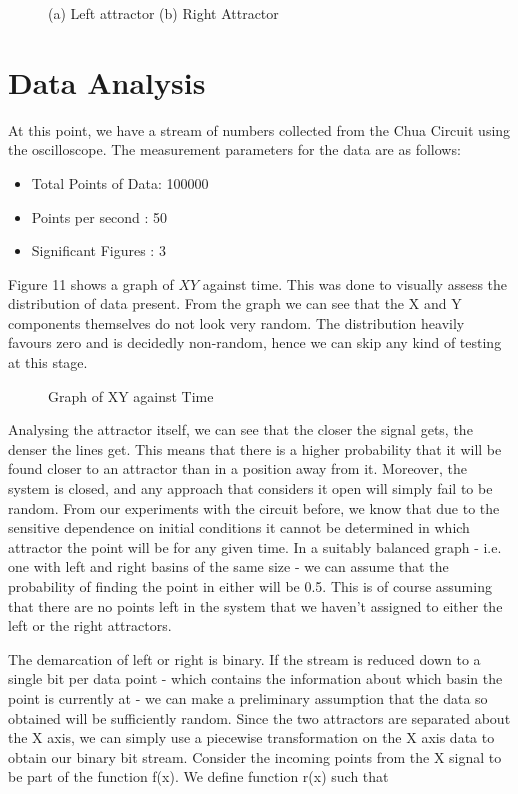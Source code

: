 \documentclass[jou,apacite]{apa6}
\begin{document}
\begin{figure}[H]
\caption{(a) Left attractor (b) Right Attractor}
\endminipage\hfill
{}
\endminipage
\end{figure}

\section{Data Analysis}

At this point, we have a stream of numbers collected from the Chua Circuit using the oscilloscope. The measurement parameters for the data are as follows:

\begin{itemize}
\item Total Points of Data: 100000
\item Points per second : 50
\item Significant Figures : 3
\end{itemize}

Figure 11 shows a graph of $XY$ against time. This was done to visually assess the distribution of data present. From the graph we can see that the X and Y components themselves do not look very random. The distribution heavily favours zero and is decidedly non-random, hence we can skip any kind of testing at this stage.

\begin{figure}[H]
\caption{Graph of XY against Time}
\end{figure}

Analysing the attractor itself, we can see that the closer the signal gets, the denser the lines get. This means that there is a higher probability that it will be found closer to an attractor than in a position away from it. Moreover, the system is closed, and any approach that considers it open will simply fail to be random. From our experiments with the circuit before, we know that due to the sensitive dependence on initial conditions it cannot be determined in which attractor the point will be for any given time. In a suitably balanced graph - i.e. one with left and right basins of the same size - we can assume that the probability of finding the point in either will be 0.5. This is of course assuming that there are no points left in the system that we haven't assigned to either the left or the right attractors. 

The demarcation of left or right is binary. If the stream is reduced down to a single bit per data point - which contains the information about which basin the point is currently at - we can make a preliminary assumption that the data so obtained will be sufficiently random. Since the two attractors are separated about the X axis, we can simply use a piecewise transformation on the X axis data to obtain our binary bit stream. Consider the incoming points from the X signal to be part of the function f(x). We define function r(x) such that 
\end{document}
